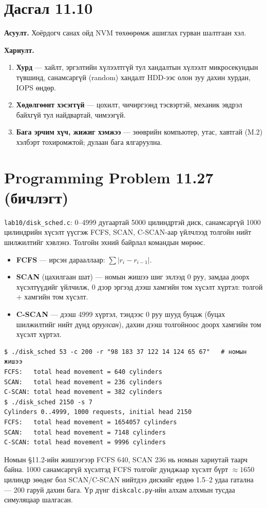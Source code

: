 \documentclass[12pt,a4paper]{article}
\newcommand{\question}[2]{\section{Дасгал #1}\textbf{Асуулт.} #2\par\medskip\textbf{Хариулт.}\par}
\begin{document}
\question{11.10}{Хоёрдогч санах ойд NVM төхөөрөмж ашиглах гурван шалтгаан хэл.}

\begin{enumerate}[leftmargin=1.5em]
  \item \textbf{Хурд} — хайлт, эргэлтийн хүлээлтгүй тул хандалтын хүлээлт микросекундын түвшинд, санамсаргүй (random) хандалт HDD-ээс олон зуу дахин хурдан, IOPS өндөр.
  \item \textbf{Хөдөлгөөнт хэсэггүй} — цохилт, чичиргээнд тэсвэртэй, механик эвдрэл байхгүй тул найдвартай, чимээгүй.
  \item \textbf{Бага эрчим хүч, жижиг хэмжээ} — зөөврийн компьютер, утас, хавтгай (M.2) хэлбэрт тохиромжтой; дулаан бага ялгаруулна.
\end{enumerate}

\section{Programming Problem 11.27 (бичлэгт)}

\texttt{lab10/disk\_sched.c}: 0–4999 дугаартай 5000 цилиндртэй диск, санамсаргүй 1000 цилиндрийн хүсэлт үүсгэж FCFS, SCAN, C-SCAN-аар үйлчлээд толгойн нийт шилжилтийг хэвлэнэ. Толгойн эхний байрлал командын мөрөөс.
\begin{itemize}[leftmargin=1.5em]
  \item \textbf{FCFS} — ирсэн дарааллаар: $\sum |r_i - r_{i-1}|$.
  \item \textbf{SCAN} (цахилгаан шат) — номын жишээ шиг эхлээд 0 руу, замдаа доорх хүсэлтүүдийг үйлчилж, 0 дээр эргээд дээш хамгийн том хүсэлт хүртэл: толгой $+$ хамгийн том хүсэлт.
  \item \textbf{C-SCAN} — дээш 4999 хүртэл, тэндээс 0 руу шууд буцаж (буцах шилжилтийг нийт дүнд \emph{оруулсан}), дахин дээш толгойноос доорх хамгийн том хүсэлт хүртэл.
\end{itemize}
\begin{lstlisting}[language={}]
$ ./disk_sched 53 -c 200 -r "98 183 37 122 14 124 65 67"   # номын жишээ
FCFS:   total head movement = 640 cylinders
SCAN:   total head movement = 236 cylinders
C-SCAN: total head movement = 382 cylinders
$ ./disk_sched 2150 -s 7
Cylinders 0..4999, 1000 requests, initial head 2150
FCFS:   total head movement = 1654057 cylinders
SCAN:   total head movement = 7148 cylinders
C-SCAN: total head movement = 9996 cylinders
\end{lstlisting}
Номын §11.2-ийн жишээгээр FCFS 640, SCAN 236 нь номын хариутай таарч байна. 1000 санамсаргүй хүсэлтэд FCFS толгойг дунджаар хүсэлт бүрт $\approx 1650$ цилиндр зөөдөг бол SCAN/C-SCAN нийтдээ дискийг ердөө 1.5–2 удаа гатална — 200 гаруй дахин бага. Үр дүнг \texttt{diskcalc.py}-ийн алхам алхмын тусдаа симуляцаар шалгасан.
\end{document}
